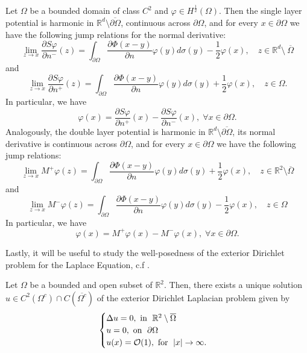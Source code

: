 \begin{proposition}\label{sl_jump}
    Let \(\Omega\) be a bounded domain of class \(C^2\) and \(\varphi \in H^\frac{1}{2}(\Omega)\). Then the single layer potential is harmonic in \(\mathbb{R}^d\setminus \overline{\partial\Omega}\), continuous across \(\partial\Omega\), and for every \(x \in \partial\Omega\) we have the following jump relations for the normal derivative:
    \[
        \lim_{z \rightarrow x} \frac{\partial S\varphi}{\partial n^-}(z) = \int_{\partial\Omega} \frac{\partial\Phi(x-y)}{\partial n}\varphi(y) d\sigma(y) - \frac{1}{2}\varphi(x), \quad z \in \mathbb{R}^d \setminus \ \overline{\Omega}
    \]
    and
    \[
        \lim_{z \rightarrow x} \frac{\partial S\varphi}{\partial n^+}(z) = \int_{\partial\Omega} \frac{\partial\Phi(x-y)}{\partial n}\varphi(y) d\sigma(y) + \frac{1}{2}\varphi(x), \quad z \in \Omega.
    \]
    In particular, we have
    \[
        \varphi(x) = \frac{\partial S\varphi}{\partial n^+}(x)-\frac{\partial S\varphi}{\partial n^-}(x), \; \forall x \in \partial\Omega.
    \]
    Analogously, the double layer potential is harmonic in \(\mathbb{R}^d\setminus \overline{\partial\Omega}\), its normal derivative is continuous across \(\partial\Omega\), and for every \(x \in \partial\Omega\) we have the following jump relations:
    \[
        \lim_{z \rightarrow x} M^+\varphi(z) = \int_{\partial\Omega} \frac{\partial\Phi(x-y)}{\partial n}\varphi(y) d\sigma(y) + \frac{1}{2}\varphi(x), \quad z \in \mathbb{R}^2\setminus\overline{\Omega}
    \]
    and
    \[
        \lim_{z \rightarrow x} M^-\varphi(z) = \int_{\partial\Omega} \frac{\partial\Phi(x-y)}{\partial n}\varphi(y) d\sigma(y) - \frac{1}{2}\varphi(x), \quad z \in \Omega
    \]
    In particular, we have
    \[
        \varphi(x) = M^+\varphi(x)-M^-\varphi(x), \; \forall x \in \partial\Omega.
    \]
\end{proposition}
Lastly, it will be useful to study the well-posedness of the exterior Dirichlet problem for the Laplace Equation, c.f \cite{salsa2016partial}.
\begin{theorem}
    Let \(\Omega\) be a bounded and open subset of \(\mathbb{R}^2\). Then, there exists a unique solution \(u \in C^2(\Omega^c) \cap C(\overline{\Omega^c})\) of the exterior Dirichlet Laplacian problem given by
    \[
        \begin{cases}
            \Delta u = 0, \text{ in } \; \mathbb{R}^2\setminus \overline{\Omega}\\
            u = 0, \text{ on } \; \partial \Omega\\
            u(x) = \mathcal{O}(1), \text{ for } \; \abs{x} \rightarrow \infty.
        \end{cases}
    \]
\end{theorem}
